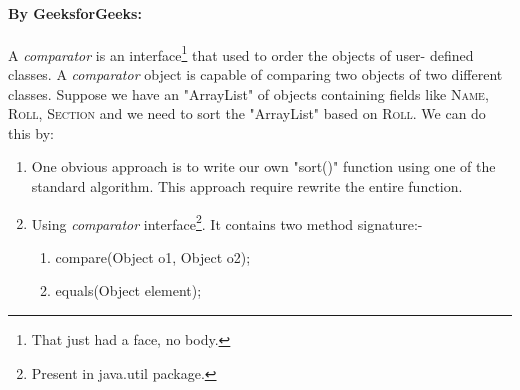 \documentclass[10 pt]{book}
\begin{document}
\paragraph{By GeeksforGeeks:}
A \textit{comparator} is an interface\footnote{That just had a face, no body.} that used to order the objects of user-	defined classes. A \textit{comparator} object is capable of comparing two objects of two different classes. Suppose we have an "ArrayList" of objects containing fields like \textsc{Name, Roll, Section} and we need to sort the "ArrayList" based on \textsc{Roll}. We can do this by:
	\begin{enumerate}
		\item[Method 1:] One obvious approach is to write our own "sort()" function using one of the standard algorithm. This approach require rewrite the entire function.
		\item[Method 2:] Using \textit{comparator} interface\footnote{Present in java.util package.}. It contains two method signature:-
		\begin{enumerate}
			\item compare(Object o1, Object o2);
			\item equals(Object element);
		\end{enumerate}
	\end{enumerate}
	
\end{document}
